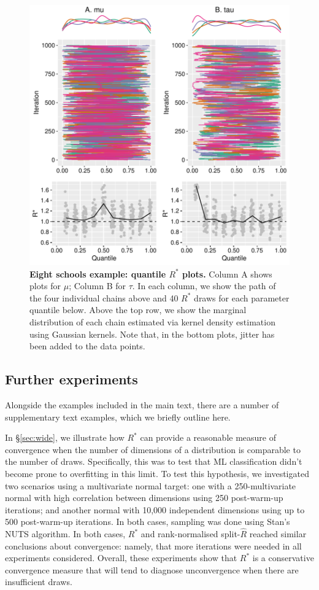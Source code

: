 \documentclass{article}
\begin{document}
\begin{figure}[!htb]
	\centerline{\includegraphics[width=1.0\textwidth]{../output/eight_schools_r_star_quantiles.pdf}}
	\caption{\textbf{Eight schools example: quantile $R^*$ plots.} Column A shows plots for $\mu$; Column B for $\tau$. In each column, we show the path of the four individual chains above and 40 $R^*$ draws for each parameter quantile below. Above the top row, we show the marginal distribution of each chain estimated via kernel density estimation using Gaussian kernels. Note that, in the bottom plots, jitter has been added to the data points.}
	\label{fig:eight_schools_r_star_quantiles}
\end{figure}

\subsection{Further experiments}\label{sec:further_experiments}
Alongside the examples included in the main text, there are a number of supplementary text examples, which we briefly outline here.

In \S\ref{sec:wide}, we illustrate how $R^*$ can provide a reasonable measure of convergence when the number of dimensions of a distribution is comparable to the number of draws. Specifically, this was to test that ML classification didn't become prone to overfitting in this limit. To test this hypothesis, we investigated two scenarios using a multivariate normal target: one with a 250-multivariate normal with high correlation between dimensions using 250 post-warm-up iterations; and another normal with 10,000 independent dimensions using up to 500 post-warm-up iterations. In both cases, sampling was done using Stan's NUTS algorithm. In both cases, $R^*$ and rank-normalised split-$\widehat{R}$ reached similar conclusions about convergence: namely, that more iterations were needed in all experiments considered. Overall, these experiments show that $R^*$ is a conservative convergence measure that will tend to diagnose unconvergence when there are insufficient draws.
\end{document}
